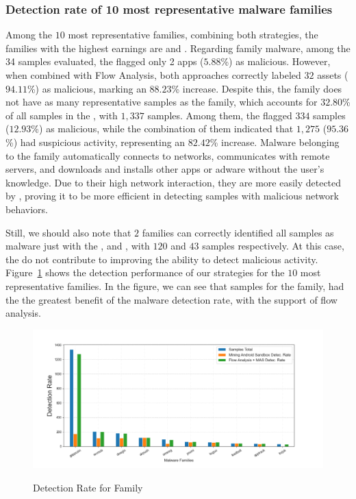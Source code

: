 \subsubsection{Detection rate of 10 most representative malware families}\label{sec:familyDetection}

Among the $10$ most representative families, combining both strategies, the families with the highest earnings are \tjk and \gps. Regarding \tjk family malware, among the 34 samples evaluated, the \fhc flagged only 2 apps ($5.88$\%) as malicious. However, when combined with Flow Analysis, both approaches correctly labeled $32$ assets ($94.11$\%) as malicious, marking an $88.23$\% increase. Despite this, the \tjk family does not have as many representative samples as the \gps family, which accounts for $32.80$\% of all samples in the \cds, with $1,337$ samples. Among them, the \mas flagged $334$ samples ($12.93$\%) as malicious, while the combination of them indicated that $1,275$ ($95.36$\%) had suspicious activity, representing an $82.42$\% increase. Malware belonging to the \gps family automatically connects to networks, communicates with remote servers, and downloads and installs other apps or adware without the user’s knowledge\cite{DBLP:journals/jnca/WangCYYPJ19}. Due to their high network interaction, they are more easily detected by \net, proving it to be more efficient in detecting samples with malicious network behaviors.

Still, we should also note that $2$ families can correctly identified all samples as malware just with the \mas,  and , with $120$ and $43$ samples respectively. At this case, the \net do not contribute to improving the ability to detect malicious activity. Figure~\ref{fig:bar} shows the detection performance of our strategies for the $10$ most representative families. In the figure, we can see that samples for the \gps family, had the the greatest benefit of the malware detection rate, with the support of flow analysis.

\begin{figure}[h]
  \centering
  
    \includegraphics[width=\linewidth]{image/barGraph.png} \\[\abovecaptionskip]
    
  \caption{Detection Rate for Family}\label{fig:bar}
\end{figure}

